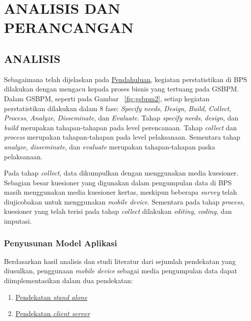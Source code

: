\chapter{ANALISIS DAN PERANCANGAN}


\section{ANALISIS}

Sebagaimana telah dijelaskan pada \hyperref[ch:chapter_1]{Pendahuluan}, kegiatan perstatistikan di BPS dilakukan dengan mengacu kepada proses bisnis yang tertuang pada GSBPM. Dalam GSBPM, seperti pada Gambar ~\ref{fig:gsbpm2}, setiap kegiatan perstatistikan dilakukan dalam 8 fase: \textit{Specify needs}, \textit{Design}, \textit{Build}, \textit{Collect}, \textit{Process}, \textit{Analyze}, \textit{Disseminate}, dan \textit{Evaluate}. Tahap \textit{specify needs}, \textit{design}, dan \textit{build} merupakan tahapan-tahapan pada level perencanaan. Tahap \textit{collect} dan \textit{process} merupakan tahapan-tahapan pada level pelaksanaan. Sementara tahap \textit{analyze}, \textit{disseminate}, dan \textit{evaluate} merupakan tahapan-tahapan paska pelaksanaan.


Pada tahap \textit{collect}, data dikumpulkan dengan menggunakan media kuesioner. Sebagian besar kuesioner yang digunakan dalam pengumpulan data di BPS masih menggunakan media kuesioner kertas, meskipun beberapa \textit{survey} telah diujicobakan untuk menggunakan \textit{mobile device}. Sementara pada tahap \textit{process}, kuesioner yang telah terisi pada tahap \textit{collect} dilakukan \textit{editing}, \textit{coding}, dan imputasi. 


\subsection{Penyusunan Model Aplikasi} \label{ssec:analysis-application-model}

Berdasarkan hasil analisis dan studi literatur dari sejumlah pendekatan yang diusulkan, penggunaan \textit{mobile device} sebagai media pengumpulan data dapat diimplementasikan dalam dua pendekatan:

\begin{enumerate}
\item \hyperref[sssec:stand-alone]{Pendekatan \textit{stand alone}}
\item \hyperref[sssec:client-server]{Pendekatan \textit{client server}}
\end{enumerate}


